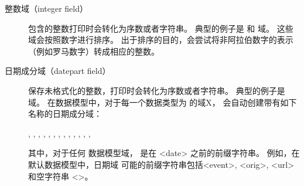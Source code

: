 \begin{description}
\begin{description}
\item[整数域（integer field）] 包含的整数打印时会转化为序数或者字符串。
典型的例子是  和  域。
这些域会按照数字进行排序。
出于排序的目的，\biber 会尝试将非阿拉伯数字的表示（例如罗马数字）转成相应的整数。

\item[日期成分域（datepart field）] 保存未格式化的整数，打印时会转化为序数或者字符串。
典型的例子是  域。
在数据模型中，对于每一个数据类型为  的域X，
会自动创建带有如下名称的日期成分域：
\begin{flushleft}
, , , , , , , , , , , , , 
\end{flushleft}
其中，对于任何  数据模型域， 是在 <date> 之前的前缀字符串。
例如，在默认数据模型中，日期域  可能的前缀字符串包括<event>, <orig>, <url> 和空字符串 <>。



\end{description}
\end{description}
